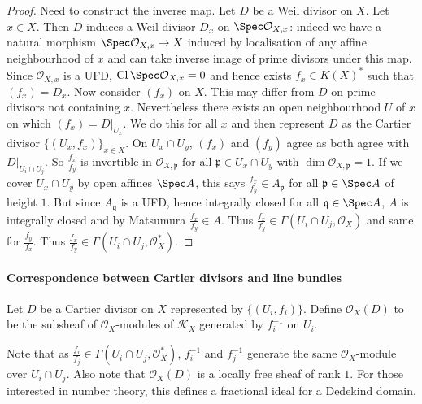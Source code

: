 \documentclass[a4paper]{article}
\newcommand{\sh}[1]{\mathcal{#1}} %
\DeclareMathOperator{\Cl}{Cl} %
\begin{document}
\begin{proof}
  Need to construct the inverse map. Let \(D\) be a Weil divisor on \(X\). Let \(x \in X\). Then \(D\) induces a Weil divisor \(D_x\) on \(\Spec \sh O_{X, x}\): indeed we have a natural morphism \(\Spec \sh O_{X, x} \to X\) induced by localisation of any affine neighbourhood of \(x\) and can take inverse image of prime divisors under this map. Since \(\sh O_{X, x}\) is a UFD, \(\Cl \Spec \sh O_{X, x} = 0\) and hence exists \(f_x \in K(X)^*\) such that \((f_x) = D_x\). Now consider \((f_x)\) on \(X\). This may differ from \(D\) on prime divisors not containing \(x\). Nevertheless there exists an open neighbourhood \(U\) of \(x\) on which \((f_x) = D|_{U_x}\). We do this for all \(x\) and then represent \(D\) as the Cartier divisor \(\{(U_x, f_x)\}_{x \in X}\). On \(U_x \cap U_y\), \((f_x)\) and \((f_y)\) agree as both agree with \(D|_{U_i \cap U_j}\). So \(\frac{f_x}{f_y}\) is invertible in \(\sh O_{X, \mathfrak p}\) for all \(\mathfrak p \in U_x \cap U_y\) with \(\dim \sh O_{X, \mathfrak p} = 1\). If we cover \(U_x \cap U_y\) by open affines \(\Spec A\), this says \(\frac{f_x}{f_y} \in A_{\mathfrak p}\) for all \(\mathfrak p \in \Spec A\) of height \(1\). But since \(A_{\mathfrak q}\) is a UFD, hence integrally closed for all \(\mathfrak q \in \Spec A\), \(A\) is integrally closed and by Matsumura \(\frac{f_x}{f_y} \in A\). Thus \(\frac{f_x}{f_y} \in \Gamma(U_i \cap U_j, \sh O_X)\) and same for \(\frac{f_y}{f_x}\). Thus \(\frac{f_x}{f_y} \in \Gamma(U_i \cap U_j, \sh O_X^*)\).
\end{proof}

\paragraph{Correspondence between Cartier divisors and line bundles}

\begin{definition}
  Let \(D\) be a Cartier divisor on \(X\) represented by \(\{(U_i, f_i)\}\). Define \(\sh O_X(D)\) to be the subsheaf of \(\sh O_X\)-modules of \(\sh K_X\) generated by \(f_i^{-1}\) on \(U_i\).
\end{definition}

Note that as \(\frac{f_i}{f_j} \in \Gamma(U_i \cap U_j, \sh O_X^*)\), \(f_i^{-1}\) and \(f_j^{-1}\) generate the same \(\sh O_X\)-module over \(U_i \cap U_j\). Also note that \(\sh O_X(D)\) is a locally free sheaf of rank \(1\). For those interested in number theory, this defines a fractional ideal for a Dedekind domain.
\end{document}
